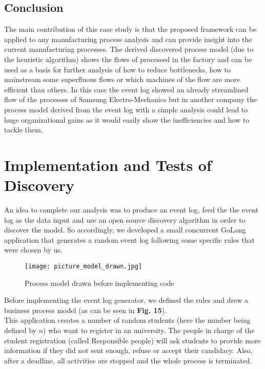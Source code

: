 \documentclass[conference]{IEEEtran}
\begin{document}
\subsection{Conclusion}

The main contribution of this case study is that the proposed framework can be applied to any manufacturing process analysis and can provide insight into the current manufacturing processes. The derived discovered process model (due to the heuristic algorithm) shows the flows of processed in the factory and can be used as a basis for further analysis of how to reduce bottlenecks, how to mainstream some superfluous flows or which machines of the flow are more efficient than others. In this case the event log showed an already streamlined flow of the processes of Samsung Electro-Mechanics but in another company the process model derived from the event log with a simple analysis could lead to huge organizational gains as it would easily show the inefficiencies and how to tackle them.

\section{Implementation and Tests of Discovery}
An idea to complete our analysis was to produce an event log, feed the the event log as the data input and use an open source discovery algorithm in order to discover the model. So accordingly, we developed a small concurrent GoLang application that generates a random event log following some specific rules that were chosen by us.\\

\begin{figure}[htp]
    \centering
    \texttt{[image: picture\_model\_drawn.jpg]}
    \caption{Process model drawn before implementing code}
    \label{fig:modelDrawn}
\end{figure}

Before implementing the event log generator, we defined the rules and drew a business process model (as can be seen in \textbf{Fig. 15}).\\

This application creates a number of random students (here the number being defined by $n$) who want to register in an university. The people in charge of the student registration (called Responsible people) will ask students to provide more information if they did not sent enough, refuse or accept their candidacy. Also, after a deadline, all activities are stopped and the whole process is terminated.\\
\end{document}
